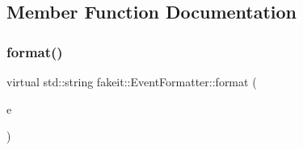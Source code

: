 \subsection{Member Function Documentation}
\mbox{\label{structfakeit_1_1EventFormatter_a103815eedb0a69ce7e3565270686bf7b}} 
\subsubsection{\texorpdfstring{format()}{format()}\hspace{0.1cm}{\footnotesize\ttfamily [1/27]}}
{\footnotesize\ttfamily virtual std\+::string fakeit\+::\+Event\+Formatter\+::format (\begin{DoxyParamCaption}\item[{const \mbox{\hyperlink{structfakeit_1_1UnexpectedMethodCallEvent}{fakeit\+::\+Unexpected\+Method\+Call\+Event}} \&}]{e }\end{DoxyParamCaption})\hspace{0.3cm}{\ttfamily [pure virtual]}}



